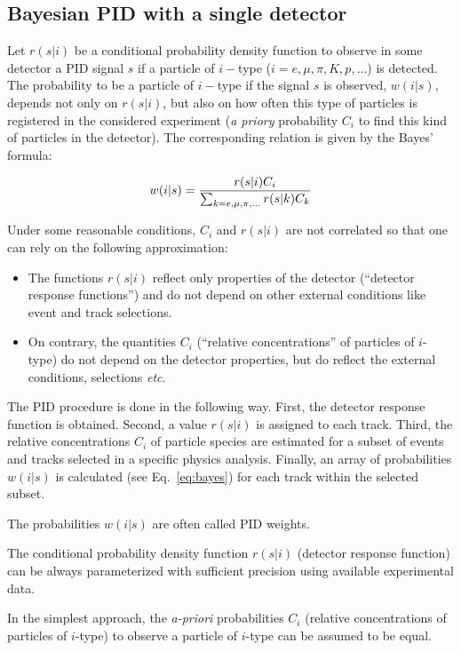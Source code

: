 \documentclass[12pt,a4paper,twoside]{article}
\begin{document}
{\subsection{Bayesian PID with a single detector}
Let $r(s|i)$ be a conditional probability density function to observe in some
detector a PID signal $s$ if a particle of $i-$type 
($i=e, \mu, \pi, K, p, ...$) 
is detected.  The probability to be a particle of $i-$type if the signal
$s$ is observed, $w(i|s)$, depends not only on $r(s|i)$, but also
on how often this type of particles is registered in the considered experiment
({\it a priory} probability $C_i$ to find this
kind of particles in the detector).  The corresponding relation is
given by the Bayes' formula:

\begin{equation}\label{eq:bayes}
  w(i|s)={r(s|i) C_i  \over \sum_{k=e, \mu, \pi, ...}{r(s|k) C_k}}
\end{equation}

Under some reasonable conditions, $C_i$ and $r(s|i)$ are not correlated
so that one can rely on the following approximation:
\begin{itemize}
\item The functions $r(s|i)$ reflect only properties of the detector
(``detector response functions'') and do not depend on
other external conditions like event and track selections.
\item On contrary, the quantities $C_i$ (``relative concentrations'' of
particles of $i$-type) do not depend on the detector
properties, but do reflect the external conditions, selections {\it etc}.
\end{itemize} 

The PID procedure is done in the following way. First,
 the detector response
function is obtained. Second, a value $r(s|i)$ is assigned to
each track.
Third, the relative concentrations $C_i$ of particle species are
 estimated for a subset of events and tracks selected in a specific
physics analysis.
Finally, an array of probabilities $w(i|s)$ is calculated (see Eq.~\ref{eq:bayes}) for each track within the selected
subset.

The probabilities $w(i|s)$ are often called PID weights. 

The conditional probability density function $r(s|i)$ 
(detector response function) can be always parameterized with sufficient
precision using available experimental data.

In the simplest approach, the {\it a-priori} probabilities
$C_i$ (relative concentrations of particles of $i$-type) to observe a
particle of $i$-type can be assumed to be equal.  

}
\end{document}
